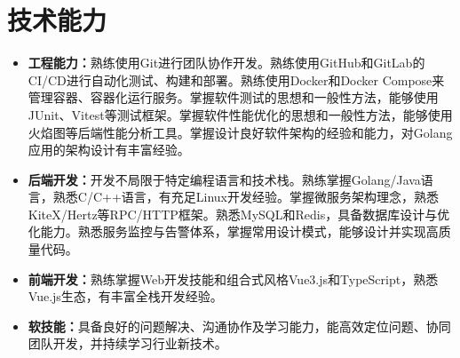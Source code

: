 \documentclass{style/template}
\begin{document}
\section{技术能力}

\begin{itemize}
    \item \textbf{工程能力：}熟练使用Git进行团队协作开发。熟练使用GitHub和GitLab的CI/CD进行自动化测试、构建和部署。熟练使用Docker和Docker Compose来管理容器、容器化运行服务。掌握软件测试的思想和一般性方法，能够使用JUnit、Vitest等测试框架。掌握软件性能优化的思想和一般性方法，能够使用火焰图等后端性能分析工具。掌握设计良好软件架构的经验和能力，对Golang应用的架构设计有丰富经验。
    \item \textbf{后端开发：}开发不局限于特定编程语言和技术栈。熟练掌握Golang/Java语言，熟悉C/C++语言，有充足Linux开发经验。掌握微服务架构理念，熟悉KiteX/Hertz等RPC/HTTP框架。熟悉MySQL和Redis，具备数据库设计与优化能力。熟悉服务监控与告警体系，掌握常用设计模式，能够设计并实现高质量代码。
    \item \textbf{前端开发：}熟练掌握Web开发技能和组合式风格Vue3.js和TypeScript，熟悉Vue.js生态，有丰富全栈开发经验。
    \item \textbf{软技能：}具备良好的问题解决、沟通协作及学习能力，能高效定位问题、协同团队开发，并持续学习行业新技术。
\end{itemize}
\end{document}
